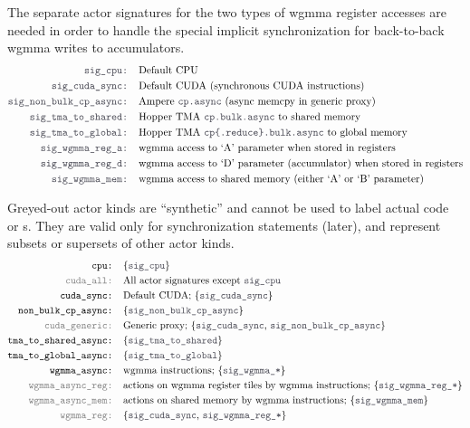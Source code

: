 \filbreak
{} The separate actor signatures for the two types of wgmma register accesses are needed in order to handle the special implicit synchronization for back-to-back wgmma writes to accumulators.
\begin{align*}
\lighttt{sig\_cpu: } & \text{Default CPU}\\
\lighttt{sig\_cuda\_sync: } & \text{Default CUDA (synchronous CUDA instructions)}\\
\lighttt{sig\_non\_bulk\_cp\_async: } & \text{Ampere \lighttt{cp.async} (async memcpy in generic proxy)}\\
\lighttt{sig\_tma\_to\_shared: } & \text{Hopper TMA \lighttt{cp.bulk.async} to shared memory}\\
\lighttt{sig\_tma\_to\_global: } & \text{Hopper TMA \lighttt{cp\{.reduce\}.bulk.async} to global memory}\\
\lighttt{sig\_wgmma\_reg\_a: } & \text{wgmma access to `A' parameter when stored in registers}\\
\lighttt{sig\_wgmma\_reg\_d: } & \text{wgmma access to `D' parameter (accumulator) when stored in registers}\\
\lighttt{sig\_wgmma\_mem: } & \text{wgmma access to shared memory (either `A' or `B' parameter)}
\end{align*}

\filbreak
{} Greyed-out actor kinds are ``synthetic'' and cannot be used to label actual code or s.
They are valid only for synchronization statements (later), and represent subsets or supersets of other actor kinds.
\begin{align*}
\texttt{cpu: } & \{\lighttt{sig\_cpu}\}\\
\graytt{cuda\_all: } & \text{All actor signatures except \lighttt{sig\_cpu}}\\
\texttt{cuda\_sync: } & \text{Default CUDA; \{\lighttt{sig\_cuda\_sync}\}}\\
\texttt{non\_bulk\_cp\_async: } & \{\lighttt{sig\_non\_bulk\_cp\_async}\}\\
\graytt{cuda\_generic: } & \text{Generic proxy; \{\lighttt{sig\_cuda\_sync}, \lighttt{sig\_non\_bulk\_cp\_async}\}}\\
\texttt{tma\_to\_shared\_async: } & \text{\{\lighttt{sig\_tma\_to\_shared}\}}\\
\texttt{tma\_to\_global\_async: } & \text{\{\lighttt{sig\_tma\_to\_global}\}}\\
\texttt{wgmma\_async: } & \text{wgmma instructions; \{\lighttt{sig\_wgmma\_*}\}}\\
\graytt{wgmma\_async\_reg: } & \text{actions on wgmma register tiles by wgmma instructions; \{\lighttt{sig\_wgmma\_reg\_*}\}}\\
\graytt{wgmma\_async\_mem: } & \text{actions on shared memory by wgmma instructions; \{\lighttt{sig\_wgmma\_mem}\}}\\
\graytt{wgmma\_reg: } & \text{\{\lighttt{sig\_cuda\_sync}, \lighttt{sig\_wgmma\_reg\_*}\}}
\end{align*}

